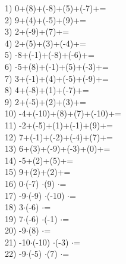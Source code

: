 \documentclass[a4paper,10pt]{article}
\begin{document}
1)   0+(8)+(-8)+(5)+(-7)+=
\vspace{0.5cm}\\2)   9+(4)+(-5)+(9)+=
\vspace{0.5cm}\\3)   2+(-9)+(7)+=
\vspace{0.5cm}\\4)   2+(5)+(3)+(-4)+=
\vspace{0.5cm}\\5)   -8+(-1)+(-8)+(-6)+=
\vspace{0.5cm}\\6)   -5+(8)+(-1)+(5)+(-3)+=
\vspace{0.5cm}\\7)   3+(-1)+(4)+(-5)+(-9)+=
\vspace{0.5cm}\\8)   4+(-8)+(1)+(-7)+=
\vspace{0.5cm}\\9)   2+(-5)+(2)+(3)+=
\vspace{0.5cm}\\10)   -4+(-10)+(8)+(7)+(-10)+=
\vspace{0.5cm}\\11)   -2+(-5)+(1)+(-1)+(9)+=
\vspace{0.5cm}\\12)   7+(-1)+(-2)+(-4)+(7)+=
\vspace{0.5cm}\\13)   6+(3)+(-9)+(-3)+(0)+=
\vspace{0.5cm}\\14)   -5+(2)+(5)+=
\vspace{0.5cm}\\15)   9+(2)+(2)+=
\vspace{0.5cm}\\16)   0$\cdot$(-7) $\cdot$(9) $\cdot$=
\vspace{0.5cm}\\17)   -9$\cdot$(-9) $\cdot$(-10) $\cdot$=
\vspace{0.5cm}\\18)   3$\cdot$(-6) $\cdot$=
\vspace{0.5cm}\\19)   7$\cdot$(-6) $\cdot$(-1) $\cdot$=
\vspace{0.5cm}\\20)   -9$\cdot$(8) $\cdot$=
\vspace{0.5cm}\\21)   -10$\cdot$(-10) $\cdot$(-3) $\cdot$=
\vspace{0.5cm}\\22)   -9$\cdot$(-5) $\cdot$(7) $\cdot$=
\end{document}
